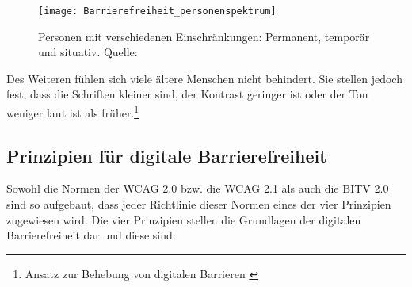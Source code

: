 \begin{figure}[H]
	\centering
	\texttt{[image: Barrierefreiheit\_personenspektrum]}
	\caption[Personen mit verschiedenen Einschränkungen: Permanent, temporär und situativ]{Personen mit verschiedenen Einschränkungen: Permanent, temporär und situativ. 
	 Quelle: \cite{mach}}
	\label{fig:Beispielhafte Einschränkungen}
\end{figure}

Des Weiteren fühlen sich viele ältere Menschen nicht behindert. Sie stellen jedoch fest, dass die Schriften kleiner sind, der Kontrast geringer ist oder der Ton weniger laut ist als früher.\footnote{Ansatz zur Behebung von digitalen Barrieren \cite{giorgashvili2020nutzerzentrierter}}

\subsection{Prinzipien für digitale Barrierefreiheit}
\label{subsec:Prinzipien fuer Barrierefreiheit}

Sowohl die Normen der \ac{WCAG} 2.0 bzw. die \ac{WCAG} 2.1 als auch die \ac{BITV} 2.0 sind so aufgebaut, dass jeder Richtlinie dieser Normen eines der vier Prinzipien zugewiesen wird. Die vier Prinzipien stellen die Grundlagen der digitalen Barrierefreiheit dar und diese sind:

